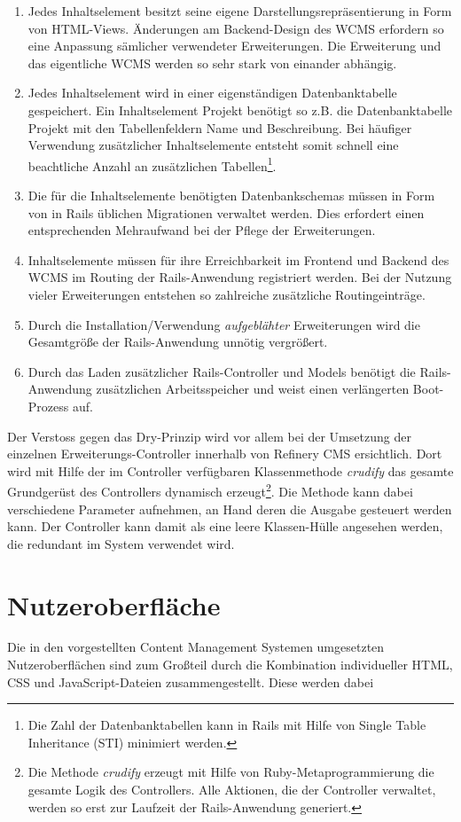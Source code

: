 \begin{enumerate}
\item
Jedes Inhaltselement besitzt seine eigene Darstellungsrepräsentierung in Form von HTML-Views. Änderungen am Backend-Design des WCMS erfordern so eine Anpassung sämlicher verwendeter Erweiterungen. Die Erweiterung und das eigentliche WCMS werden so sehr stark von einander abhängig.
\item
Jedes Inhaltselement wird in einer eigenständigen Datenbanktabelle gespeichert. Ein Inhaltselement Projekt
benötigt so z.B. die Datenbanktabelle Projekt mit den Tabellenfeldern Name und Beschreibung. Bei häufiger Verwendung zusätzlicher Inhaltselemente entsteht somit schnell eine beachtliche Anzahl an zusätzlichen Tabellen\footnote{Die Zahl der Datenbanktabellen kann in Rails mit Hilfe von Single Table Inheritance (STI) minimiert werden.}.
\item
Die für die Inhaltselemente benötigten Datenbankschemas müssen in Form von in Rails üblichen Migrationen verwaltet werden. Dies erfordert einen entsprechenden Mehraufwand bei der Pflege der Erweiterungen.
\item
Inhaltselemente müssen für ihre Erreichbarkeit im Frontend und Backend des WCMS im Routing der Rails-Anwendung registriert werden. Bei der Nutzung vieler Erweiterungen entstehen so zahlreiche zusätzliche Routingeinträge.
\item
Durch die Installation/Verwendung \emph{aufgeblähter} Erweiterungen wird die Gesamtgröße der Rails-Anwendung unnötig vergrößert.
\item
Durch das Laden zusätzlicher Rails-Controller und Models benötigt die Rails-Anwendung zusätzlichen Arbeitsspeicher und weist einen verlängerten Boot-Prozess auf.
\end{enumerate}


Der Verstoss gegen das Dry-Prinzip wird vor allem bei der Umsetzung der einzelnen Erweiterungs-Controller innerhalb von Refinery CMS ersichtlich. Dort wird mit Hilfe der im Controller verfügbaren Klassenmethode \emph{crudify} das gesamte Grundgerüst des Controllers dynamisch erzeugt\footnote{Die Methode \emph{crudify} erzeugt mit Hilfe von Ruby-Metaprogrammierung die gesamte Logik des Controllers. Alle Aktionen, die der Controller verwaltet, werden so erst zur Laufzeit der Rails-Anwendung generiert.}. Die Methode kann dabei verschiedene Parameter aufnehmen, an Hand deren die Ausgabe gesteuert werden kann. Der Controller kann damit als eine leere Klassen-Hülle angesehen werden, die redundant im System verwendet wird.





\section{Nutzeroberfläche}


Die in den vorgestellten Content Management Systemen umgesetzten Nutzeroberflächen sind zum Großteil durch die Kombination individueller HTML, CSS und JavaScript-Dateien zusammengestellt. Diese werden dabei 

